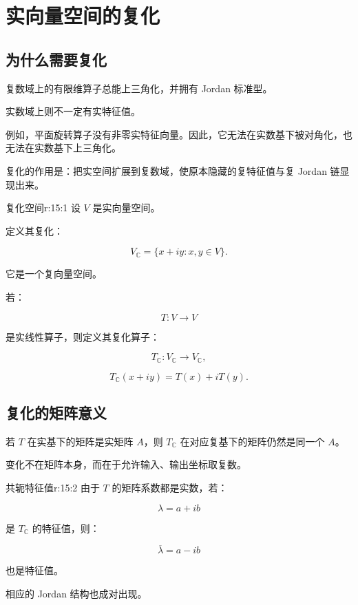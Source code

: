 
\chapter{实向量空间的复化}


\section{为什么需要复化}

复数域上的有限维算子总能上三角化，并拥有 Jordan 标准型。

实数域上则不一定有实特征值。

例如，平面旋转算子没有非零实特征向量。因此，它无法在实数基下被对角化，也无法在实数基下上三角化。

复化的作用是：把实空间扩展到复数域，使原本隐藏的复特征值与复 Jordan 链显现出来。

\begin{jdefn}{复化空间}{r:15:1}
设 $V$ 是实向量空间。

定义其复化：

\[
V_{\mathbb C}
=
\{x+iy:x,y\in V\}.
\]

它是一个复向量空间。

若：

\[
T:V\to V
\]

是实线性算子，则定义其复化算子：

\[
T_{\mathbb C}:V_{\mathbb C}\to V_{\mathbb C},
\]

\[
T_{\mathbb C}(x+iy)
=
T(x)+iT(y).
\]
\end{jdefn}

\section{复化的矩阵意义}

若 $T$ 在实基下的矩阵是实矩阵 $A$，则 $T_{\mathbb C}$ 在对应复基下的矩阵仍然是同一个 $A$。

变化不在矩阵本身，而在于允许输入、输出坐标取复数。

\begin{jprop}{共轭特征值}{r:15:2}
由于 $T$ 的矩阵系数都是实数，若：

\[
\lambda=a+ib
\]

是 $T_{\mathbb C}$ 的特征值，则：

\[
\overline\lambda=a-ib
\]

也是特征值。

相应的 Jordan 结构也成对出现。
\end{jprop}
